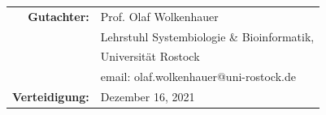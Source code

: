 \begin{titlepage}
\begin{center}
\begin{tabular}{rl}
\large \textbf{Gutachter:}	&  	\quad Prof. Olaf Wolkenhauer\\
							&  	\quad Lehrstuhl Systembiologie \& Bioinformatik,\\
							&	\quad Universität Rostock\\
							&	\quad email: olaf.wolkenhauer@uni-rostock.de\\
\large \textbf{Verteidigung:}	& 	Dezember 16, 2021

\end{tabular}
\end{center}



\end{titlepage}
